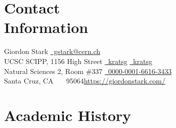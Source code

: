 \documentclass[margin,line]{resume}
\let\origsection\section%
\let\section\subsection%
\let\section\origsection%
\begin{document}

\begin{resume}

\section{\mysidestyle Contact\\Information}

Giordon Stark                 \hfill \href{mailto:gstark@cern.ch}{~gstark@cern.ch}
\vspace{0mm}\\\vspace{0mm}%
UCSC SCIPP, 1156 High Street  \hfill \href{https://github.com/kratsg}{~kratsg} {\large\rmfamily\textbullet} \href{https://twitter.com/kratsg}{~kratsg}
\vspace{0mm}\\\vspace{0mm}%
Natural Sciences 2, Room \#337       \hfill \href{https://orcid.org/0000-0001-6616-3433}{~0000-0001-6616-3433}
\vspace{0mm}\\\vspace{0mm}%
Santa Cruz, CA \ \ \ 95064\hfill\href{https://giordonstark.com/?utm_source=cv}{https://giordonstark.com/}\\
\vspace{-6.5mm}%

\section{\mysidestyle Academic History}


\end{resume}
\end{document}
